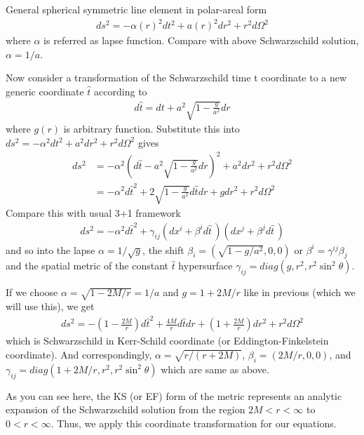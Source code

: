 \documentclass[a4paper,oneside,openany,11pt]{memoir}
\numberwithin{equation}{section} %
\begin{document}
General spherical symmetric line element in polar-areal form
\begin{align}
\label{eqn:ss-met-pa}
ds^2 = - \alpha(r)^2 dt^2 + a(r)^2 dr^2 + r^2 d \Omega^2
\end{align}
where $\alpha$ is referred as lapse function. Compare with above Schwarzschild solution, $\alpha = 1/a$. 

Now consider a transformation of the Schwarzschild time t coordinate to a new generic coordinate $\hat{t}$ according to
\begin{align}
d\hat{t} = dt + a^2 \sqrt{1-\frac{g}{a^2}} dr
\end{align}
where $g(r)$ is arbitrary function. Substitute this into $ds^2 = -\alpha^2 dt^2 + a^2 dr^2 + r^2 d\Omega^2$ gives
\begin{align}
ds^2 &= - \alpha^2 \left (d\hat{t} - a^2 \sqrt{1-\frac{g}{a^2}} dr\right)^2 + a^2 dr^2 + r^2 d\Omega^2 \nonumber \\
&= - \alpha^2 d \hat{t}^2 + 2 \sqrt{1-\frac{g}{a^2}} d\hat{t} dr + g dr^2 + r^2 d \Omega^2
\end{align}
Compare this with usual 3+1 framework
\begin{align}
ds^2 = - \alpha^2 d \hat{t}^2 + \gamma_{ij} (dx^i + \beta^i d\hat{t}\,)(dx^j + \beta^j d\hat{t}\,)
\end{align}
and so into the lapse $\alpha = 1/\sqrt{g}$, the shift $\beta_i = (\sqrt{1-g/a^2},0,0)$ or $\beta^i = \gamma^{ij} \beta_j$ and the spatial metric of the constant $\hat{t}$ hypersurface $\gamma_{ij} = diag(g,r^2,r^2\sin^2 \theta)$. 

If we choose $\alpha = \sqrt{1-2M/r} = 1/a$ and $g = 1+2M/r$ like in previous (which we will use this), we get
\begin{align}
ds^2 = - \left(1 - \frac{2M}{r} \right) d \hat{t}^2 + \frac{4M}{r} d \hat{t} dr + \left(1+\frac{2M}{r} \right) dr^2 + r^2 d\Omega^2
\end{align}
which is Schwarzschild in Kerr-Schild coordinate (or Eddington-Finkelstein coordinate). And correspondingly, $\alpha = \sqrt{r/(r+2M)}$, $\beta_i = (2M/r,0,0)$, and $\gamma_{ij} = diag(1+2M/r,r^2,r^2\sin^2 \theta)$ which are same as above.

As you can see here, the KS (or EF) form of the metric represents an analytic expansion of the Schwarzschild solution from the region $2M < r< \infty$ to  $0<r<\infty$. Thus, we apply this coordinate transformation for our equations.
\end{document}
